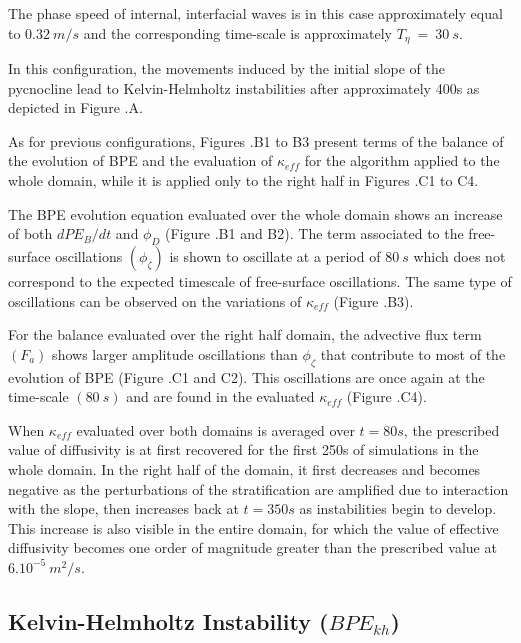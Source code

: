 The phase speed of internal, interfacial waves is in this case approximately equal to $0.32\ m/s$ and the corresponding time-scale is approximately $T_{\eta}\ =\ 30\ s$.

In this configuration, the movements induced by the initial slope of the pycnocline lead to Kelvin-Helmholtz instabilities after approximately 400s as depicted in Figure .A.

As for previous configurations, Figures .B1 to B3 present terms of the balance of the evolution of BPE and the evaluation of $\kappa_{eff}$ for the algorithm applied to the whole domain, while it is applied only to the right half in Figures .C1 to C4.

The BPE evolution equation evaluated over the whole domain shows an increase of both $dPE_B/dt$ and $\phi_D$ (Figure .B1 and B2). The term associated to the free-surface oscillations $(\phi_{\zeta})$ is shown to oscillate at a period of $80\ s$ which does not correspond to the expected timescale of free-surface oscillations. The same type of oscillations can be observed on the variations of $\kappa_{eff}$ (Figure .B3). 

For the balance evaluated over the right half domain, the advective flux term $(F_a)$ shows larger amplitude oscillations than $\phi_{\zeta}$ that contribute to most of the evolution of BPE (Figure .C1 and C2). This oscillations are once again at the time-scale $(80\ s)$ and are found in the evaluated $\kappa_{eff}$ (Figure .C4).

When $\kappa_{eff}$ evaluated over both domains is averaged over $t=80s$, the prescribed value of diffusivity is at first recovered for the first 250s of simulations in the whole domain. In the right half of the domain, it first decreases and becomes negative as the perturbations of the stratification are amplified due to interaction with the slope, then increases back at $t=350s$ as instabilities begin to develop. This increase is also visible in the entire domain, for which the value of effective diffusivity becomes one order of magnitude greater than the prescribed value at $6.10^{-5} \ m^2/s$. 

\subsection{Kelvin-Helmholtz Instability ($BPE_{kh}$)}

